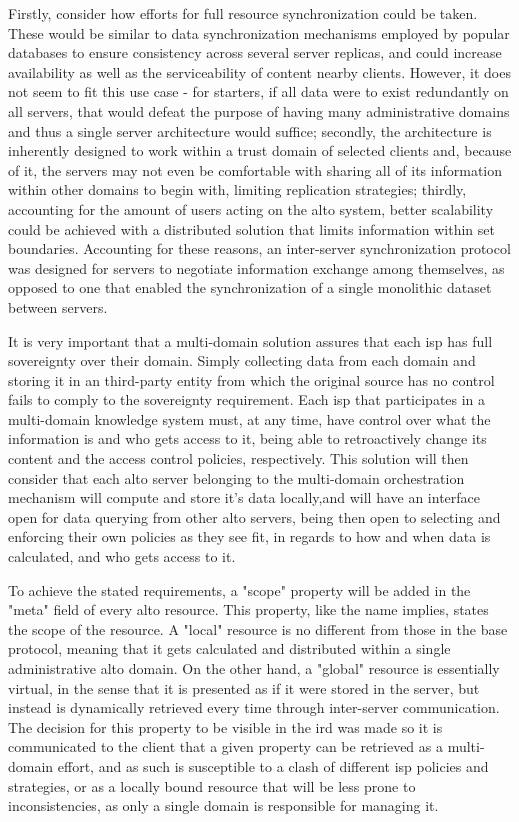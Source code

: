     Firstly, consider how efforts for full resource synchronization could be taken.
    These would be similar to data synchronization mechanisms employed by popular databases to ensure consistency across several server replicas, and could increase availability as well as the serviceability of content nearby clients.
    However, it does not seem to fit this use case - for starters, if all data were to exist redundantly on all servers, that would defeat the purpose of having many administrative domains and thus a single server architecture would suffice; secondly, the architecture is inherently designed to work within a trust domain of selected clients and, because of it, the servers may not even be comfortable with sharing all of its information within other domains to begin with, limiting replication strategies; thirdly, accounting for the amount of users acting on the \gls{alto} system, better scalability could be achieved with a distributed solution that limits information within set boundaries.
    Accounting for these reasons, an inter-server synchronization protocol was designed for servers to negotiate information exchange among themselves, as opposed to one that enabled the synchronization of a single monolithic dataset between servers.

    It is very important that a multi-domain solution assures that each \gls{isp} has full sovereignty over their domain.
    Simply collecting data from each domain and storing it in an third-party entity from which the original source has no control fails to comply to the sovereignty requirement.
    Each \gls{isp} that participates in a multi-domain knowledge system must, at any time, have control over what the information is and who gets access to it, being able to retroactively change its content and the access control policies, respectively.
    This solution will then consider that each \gls{alto} server belonging to the multi-domain orchestration mechanism will compute and store it's data locally,and will have an interface open for data querying from other \gls{alto} servers, being then open to selecting and enforcing their own policies as they see fit, in regards to how and when data is calculated, and who gets access to it.

    To achieve the stated requirements, a "scope" property will be added in the "meta" field of every \gls{alto} resource.
    This property, like the name implies, states the scope of the resource.
    A "local" resource is no different from those in the base protocol, meaning that it gets calculated and distributed within a single administrative \gls{alto} domain.
    On the other hand, a "global" resource is essentially virtual, in the sense that it is presented as if it were stored in the server, but instead is dynamically retrieved every time through inter-server communication.
    The decision for this property to be visible in the \gls{ird} was made so it is communicated to the client that a given property can be retrieved as a multi-domain effort, and as such is susceptible to a clash of different \gls{isp} policies and strategies, or as a locally bound resource that will be less prone to inconsistencies, as only a single domain is responsible for managing it.

